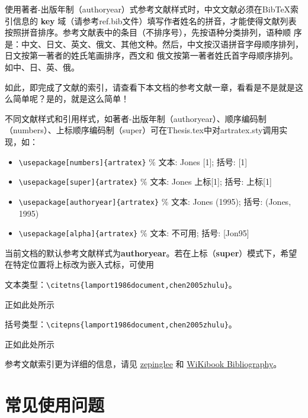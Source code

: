 使用著者-出版年制（authoryear）式参考文献样式时，中文文献必须在BibTeX索引信息的 \textbf{key} 域（请参考ref.bib文件）填写作者姓名的拼音，才能使得文献列表按照拼音排序。参考文献表中的条目（不排序号），先按语种分类排列，语种顺 序是：中文、日文、英文、俄文、其他文种。然后，中文按汉语拼音字母顺序排列，日文按第一著者的姓氏笔画排序，西文和 俄文按第一著者姓氏首字母顺序排列。如中\citep{niu2013zonghe}、日\citep{Bohan1928}、英\citep{stamerjohanns2009mathml}、俄\citep{Dubrovin1906}。

如此，即完成了文献的索引，请查看下本文档的参考文献一章，看看是不是就是这么简单呢？是的，就是这么简单！

不同文献样式和引用样式，如著者-出版年制（authoryear）、顺序编码制（numbers）、上标顺序编码制（super）可在Thesis.tex中对artratex.sty调用实现，如：
\begin{itemize}
    \footnotesize
    \item \verb+\usepackage[numbers]{artratex}+ $\%$ 文本: Jones [1]; 括号: [1]
    \item \verb+\usepackage[super]{artratex}+ $\%$ 文本: Jones 上标[1]; 括号: 上标[1]
    \item \verb+\usepackage[authoryear]{artratex}+ $\%$ 文本: Jones (1995); 括号: (Jones, 1995)
    \item \verb+\usepackage[alpha]{artratex}+ $\%$ 文本: 不可用; 括号: [Jon95]
\end{itemize}

当前文档的默认参考文献样式为\textbf{authoryear}。若在上标（\textbf{super}）模式下，希望在特定位置将上标改为嵌入式标，可使用

文本类型：\verb|\citetns{lamport1986document,chen2005zhulu}|。

正如此处所示

括号类型：\verb|\citepns{lamport1986document,chen2005zhulu}|。

正如此处所示

参考文献索引更为详细的信息，请见 \href{https://github.com/zepinglee/gbt7714-bibtex-style}{zepinglee} 和 \href{https://en.wikibooks.org/wiki/LaTeX/Bibliography_Management}{WiKibook Bibliography}。

\nocite{*}

\section{常见使用问题}\label{sec:qa}

